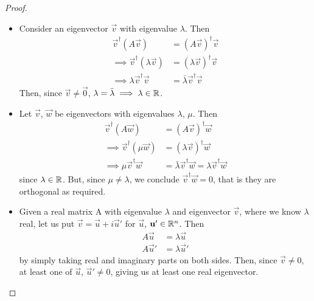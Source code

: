 \documentclass{../template/note}
\begin{document}
    \begin{proof}
        \begin{itemize}
            \item Consider an eigenvector \(\vec v\) with eigenvalue \(\lambda\). Then
            \begin{align*}
                \vec v^\dagger (A \vec v) &= (A \vec v)^\dagger \vec v \\
                \implies \vec v^\dagger (\lambda \vec v) &= (\lambda \vec v)^\dagger \vec v \\
                \implies \lambda \vec v^\dagger \vec v &= \bar\lambda \vec v^\dagger \vec v
            \end{align*}
            Then, since \(\vec v \neq \vec 0\), \(\lambda = \bar\lambda \implies \lambda \in \mathbb R\).
            \item Let \(\vec v\), \(\vec w\) be eigenvectors with eigenvalues \(\lambda\), \(\mu\). Then
            \begin{align*}
                \vec v^\dagger(A \vec w) &= (A \vec v)^\dagger \vec w \\
                \implies \vec v^\dagger(\mu \vec w) &= (\lambda \vec v)^\dagger \vec w \\
                \implies \mu \vec v^\dagger \vec w &= \bar\lambda \vec v^\dagger \vec w = \lambda \vec v^\dagger \vec w
            \end{align*}
            since \(\lambda \in \mathbb R\). But, since \(\mu \neq \lambda\), we conclude \(\vec v^\dagger \vec w = 0\), that is they are orthogonal as required.
            \item Given a real matrix A with eigenvalue \(\lambda\) and eigenvector \(\vec v\), where we know \(\lambda\) real, let us put \(\vec v = \vec u + i \vec u'\) for \(\vec u\), \(\vec u' \in \RR^n\). Then
            \begin{align*}
                A \vec u &= \lambda \vec u \\
                A \vec u' &= \lambda \vec u'
            \end{align*}
            by simply taking real and imaginary parts on both sides. Then, since \(\vec v \neq 0\), at least one of \(\vec u\), \(\vec u' \neq 0\), giving us at least one real eigenvector.
            
        \end{itemize}
        
        
    \end{proof}

    
\end{document}
